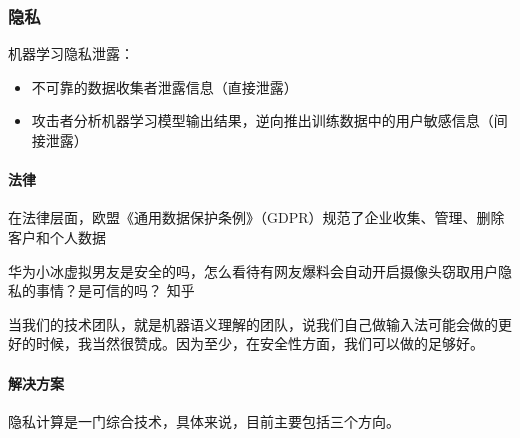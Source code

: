 \documentclass[letterpaper,10pt,english]{sphinxmanual}
\begin{document}
\subsubsection{隐私}
\label{\detokenize{chapter_data_dive/private:id1}}\label{\detokenize{chapter_data_dive/private::doc}}
机器学习隐私泄露：
\begin{itemize}
\item {} 
不可靠的数据收集者泄露信息（直接泄露）

\item {} 
攻击者分析机器学习模型输出结果，逆向推出训练数据中的用户敏感信息（间接泄露）

\end{itemize}


\paragraph{法律}
\label{\detokenize{chapter_data_dive/private:id2}}
在法律层面，欧盟《通用数据保护条例》（GDPR）规范了企业收集、管理、删除客户和个人数据%
\begin{footnote}[910]\sphinxAtStartFootnote
{}
%
\end{footnote}

华为小冰虚拟男友是安全的吗，怎么看待有网友爆料会自动开启摄像头窃取用户隐私的事情？是可信的吗？
\sphinxhyphen{} 知乎 

当我们的技术团队，就是机器语义理解的团队，说我们自己做输入法可能会做的更好的时候，我当然很赞成。因为至少，在安全性方面，我们可以做的足够好。%
\begin{footnote}[911]\sphinxAtStartFootnote
{}
%
\end{footnote}


\paragraph{解决方案}
\label{\detokenize{chapter_data_dive/private:id3}}
隐私计算是一门综合技术，具体来说，目前主要包括三个方向。%
\begin{footnote}[912]\sphinxAtStartFootnote
{}
%
\end{footnote}
\end{document}
